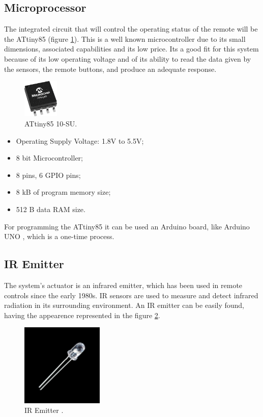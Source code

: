 \documentclass[12pt, letterpaper]{report}
\begin{document}
\subsection{Microprocessor}
The integrated circuit that will control the operating status of the remote will be the ATtiny85 \cite{microp} (figure \ref{fig:attiny}). This is a well known microcontroller due to its small dimensions, associated capabilities and its low price. Its a good fit for this system because of its low operating voltage and of its ability to read the data given by the sensors, the remote buttons, and produce an adequate response.

\begin{figure}[ht]
	\centering
	\includegraphics[width=0.15\textwidth]{attiny}
	\caption{ATtiny85 10-SU.}
	\label{fig:attiny}
\end{figure}

\begin{itemize}
	\item Operating Supply Voltage: 1.8V to 5.5V;
	\item 8 bit Microcontroller;
	\item 8 pins, 6 GPIO pins;
	\item 8 kB of program memory size;
	\item 512 B data RAM size.
\end{itemize}

For programming the ATtiny85 it can be used an Arduino board, like Arduino UNO \cite{arduno}, which is a one-time process.

\subsection{IR Emitter}
The system’s actuator is an infrared emitter, which has been used in remote controls since the early 1980s. IR sensors are used to measure and detect infrared radiation in its surrounding environment. An IR emitter can be easily found, having the appearence represented in the figure \ref{fig:iremitter}.

\begin{figure}[ht]
	\centering
	\includegraphics[width=0.35\textwidth]{iremitter}
	\caption{IR Emitter \cite{ir}.}
	\label{fig:iremitter}
\end{figure}
\end{document}

